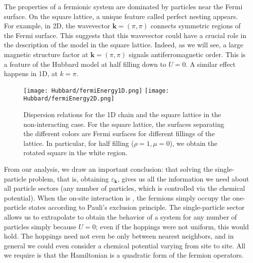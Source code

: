 The properties of a fermionic system are dominated by particles near the Fermi surface.
On the square lattice, a unique feature called perfect nesting appears. 
For example, in \acs{2D}, the wavevector $\bm k = (\pi , \pi)$ connects symmetric regions of the Fermi surface.
This suggests that this wavevector could have a crucial role in the description of the model in the square lattice.
Indeed, as we will see, a large magnetic structure factor at $\bm k = (\pi , \pi)$ signals antiferromagnetic order.
This is a feature of the Hubbard model at half filling down to $U = 0$.
A similar effect happens in \acs{1D}, at $k = \pi$.

\begin{figure}[H]
\hspace{1.2cm}
\texttt{[image: Hubbard/fermiEnergy1D.png]}
\hspace{-1mm}
\texttt{[image: Hubbard/fermiEnergy2D.png]}
	\caption[Dispersion relations for the \acs{1D} chain and the square lattice in the non-interacting case.]{Dispersion relations for the \acs{1D} chain and the square lattice in the non-interacting case.
	For the square lattice, the surfaces separating the different colors are Fermi surfaces for different fillings of the lattice. In particular, for half filling ($\rho = 1, \mu = 0$), we obtain the rotated square in the white region.}
	\label{fig:fermi1D}
\end{figure}

From our analysis, we draw an important conclusion: that solving the single-particle problem, that is, obtaining $\varepsilon_{\bm k}$, gives us all the information we need about all particle sectors (any number of particles, which is controlled via the chemical potential).
When the on-site interaction is , the fermions simply occupy the one-particle states according to Pauli's exclusion principle.
The single-particle sector allows us to extrapolate to obtain the behavior of a system for any number of particles simply because $U = 0$; even if the hoppings were not uniform, this would hold.
The hoppings need not even be only between nearest neighbors, and in general we could even consider a chemical potential varying from site to site.
All we require is that the Hamiltonian is a quadratic form of the fermion operators.
